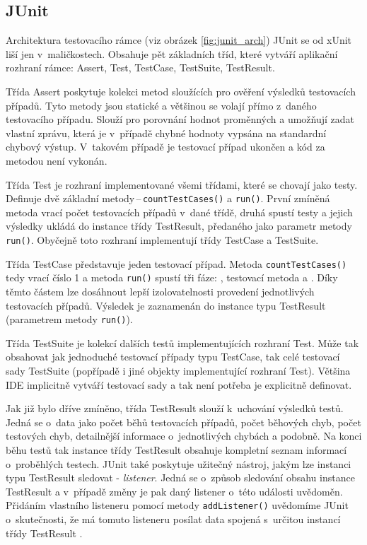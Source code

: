     \subsection{JUnit}
    \label{section:JUnit}
    Architektura testovacího rámce (viz obrázek \ref{fig:junit_arch}) JUnit se od xUnit liší jen v~maličkostech. Obsahuje pět základních tříd, které vytváří aplikační rozhraní rámce: Assert, Test, TestCase, TestSuite, TestResult.

    Třída Assert poskytuje kolekci metod sloužících pro ověření výsledků testovacích případů. Tyto metody jsou statické a většinou se volají přímo z~daného testovacího případu. Slouží pro porovnání hodnot proměnných a umožňují zadat vlastní zprávu, která je v~případě chybné hodnoty vypsána na standardní chybový výstup. V~takovém případě je testovací případ ukončen a kód za metodou není vykonán.

    Třída Test je rozhraní implementované všemi třídami, které se chovají jako testy. Definuje dvě základní metody\,--\,\texttt{countTestCases()} a \texttt{run()}. První zmíněná metoda vrací počet testovacích případů v~dané třídě, druhá spustí testy a jejich výsledky ukládá do instance třídy TestResult, předaného jako parametr metody \texttt{run()}. Obyčejně toto rozhraní implementují třídy TestCase a TestSuite.

    Třída TestCase představuje jeden testovací případ. Metoda \texttt{countTestCases()} tedy vrací číslo 1 a metoda \texttt{run()} spustí tři fáze: , testovací metoda a . Díky těmto částem lze dosáhnout lepší izolovatelnosti provedení jednotlivých testovacích případů. Výsledek je zaznamenán do instance typu TestResult (parametrem metody \texttt{run()}).

    Třída TestSuite je kolekcí dalších testů implementujících rozhraní Test. Může tak obsahovat jak jednoduché testovací případy typu TestCase, tak celé testovací sady TestSuite (popřípadě i jiné objekty implementující rozhraní Test). Většina IDE implicitně vytváří testovací sady a tak není potřeba je explicitně definovat.

    Jak již bylo dříve zmíněno, třída TestResult slouží k~uchování výsledků testů. Jedná se o~data jako počet běhů testovacích případů, počet běhových chyb, počet testových chyb, detailnější informace o~jednotlivých chybách a podobně. Na konci běhu testů tak instance třídy TestResult obsahuje kompletní seznam informací o~proběhlých testech. JUnit také poskytuje užitečný nástroj, jakým lze instanci typu TestResult sledovat - \emph{listener}. Jedná se o~způsob sledování obsahu instance TestResult a v~případě změny je pak daný listener o~této události uvědoměn. Přidáním vlastního listeneru pomocí metody \texttt{addListener()} uvědomíme JUnit o~skutečnosti, že má tomuto listeneru posílat data spojená s~určitou instancí třídy TestResult \cite{JUnitGuide}.

